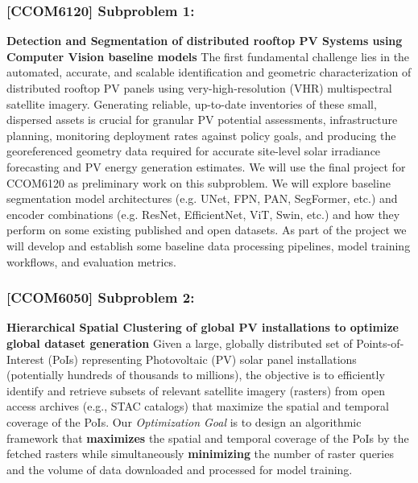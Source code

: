 \subsubsection{[CCOM6120] Subproblem 1:}
    \textbf{Detection and Segmentation of distributed rooftop PV Systems using Computer Vision baseline models} 
    The first fundamental challenge lies in the automated, accurate, and scalable identification and geometric characterization of distributed rooftop PV panels using very-high-resolution (VHR) multispectral satellite imagery. 
    Generating reliable, up-to-date inventories of these small, dispersed assets is crucial for granular PV potential assessments\cite{Pueblas_workflow_rooftop_PV_assessment_sat_img_2023}\cite{Jiang_rooftop_pv_assessment_2022}, infrastructure planning, 
    monitoring deployment rates against policy goals\cite{de-Hoog_sota_survey_2020}, and producing the georeferenced geometry data required for accurate site-level solar irradiance forecasting and PV energy generation estimates\cite{Bansal_ssl_nowcasting_2022}.
    We will use the final project for CCOM6120 as preliminary work on this subproblem. We will explore baseline segmentation model architectures (e.g. UNet, FPN, PAN, SegFormer, etc.) and 
    encoder combinations (e.g. ResNet, EfficientNet, ViT, Swin, etc.) and how they perform on some existing published and open datasets. As part of the project we will develop and establish some baseline data processing pipelines, model training workflows, and evaluation metrics.

\subsubsection{[CCOM6050] Subproblem 2:} 
    \textbf{Hierarchical Spatial Clustering of global PV installations to optimize global dataset generation} 
    Given a large, globally distributed set of Points-of-Interest (PoIs) representing Photovoltaic (PV) solar panel installations (potentially hundreds of thousands to millions), 
    the objective is to efficiently identify and retrieve subsets of relevant satellite imagery (rasters) from open access archives (e.g., STAC catalogs) that maximize the spatial and temporal coverage of the PoIs. 
    Our \textit{Optimization Goal} is to design an algorithmic framework that \textbf{maximizes} the spatial and temporal coverage of the PoIs by the fetched rasters while simultaneously 
    \textbf{minimizing} the number of raster queries and the volume of data downloaded and processed for model training. 


